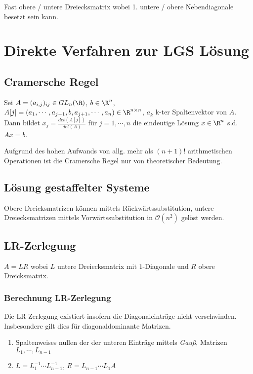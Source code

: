 Fast obere / untere Dreiecksmatrix wobei 1. untere / obere Nebendiagonale besetzt sein kann.

\section*{Direkte Verfahren zur LGS Lösung}

\subsection*{Cramersche Regel}

Sei $A = (a_{i,j})_{ij} \in GL_n(\R)$, $b \in \R^n$, $A[j] = (a_1, \cdots, a_{j-1}, b, a_{j+1}, \cdots, a_n) \in \R^{n \times n}$, $a_k$ k-ter Spaltenvektor von $A$. Dann bildet $x_j = \frac{det(A[j])}{det(A)}$ für $j = 1, \cdots, n$ die eindeutige Lösung $x \in \R^n$ s.d. $Ax=b$.

Aufgrund des hohen Aufwands von allg. mehr als $(n+1)!$ arithmetischen Operationen ist die Cramersche Regel nur von theoretischer Bedeutung.

\subsection*{Lösung gestaffelter Systeme}

Obere Dreicksmatrizen können mittels Rückwärtssubstitution, untere Dreiecksmatrizen mittels Vorwärtssubstitution in $\mathcal{O}(n^2)$ gelöst werden.

\subsection*{LR-Zerlegung}

$A = LR$ wobei $L$ untere Dreiecksmatrix mit $1$-Diagonale und $R$ obere Dreicksmatrix.

\subsubsection*{Berechnung LR-Zerlegung}

Die LR-Zerlegung existiert insofern die Diagonaleinträge nicht verschwinden. Insbesondere gilt dies für diagonaldominante Matrizen.

\begin{enumerate}
	\item Spaltenweises nullen der der unteren Einträge mittels \emph{Gauß}, Matrizen $L_1, \cdots, L_{n-1}$
	\item $L = L_1^{-1} \cdots L_{n-1}^{-1}$, $R=L_{n-1} \cdots L_1 A$
\end{enumerate}

